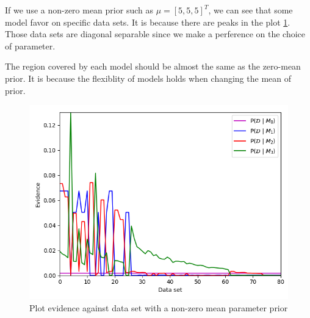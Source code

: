 \documentclass[12pt]{article}
\newenvironment{question}[2][Question]{\begin{trivlist}
\kern10pt
\item[\hskip \labelsep {\bfseries #1}\hskip \labelsep {\bfseries #2.}]}{\end{trivlist}}
\begin{document}
\begin{question}{24}
If we use a non-zero mean prior such as $\mu = [5, 5, 5]^T$, we can see that
some model favor on specific data sets. It is because there are peaks in the plot
\ref{fig:Q24-non-zero-plotEvid}. Those data sets are diagonal separable since 
we make a perference on the choice of parameter.

The region covered by each model should be almost the same as the zero-mean prior.
It is because the flexiblity of models holds when changing the mean of prior.
  
  \begin{figure}[h] 
    \centering
    \includegraphics[width=0.5\linewidth]{fig/Q24-non-zero-mean-sub.png}
    \caption{Plot evidence against data set with a non-zero mean parameter prior}
    \label{fig:Q24-non-zero-plotEvid}
  \end{figure}
\end{question}
\end{document}
